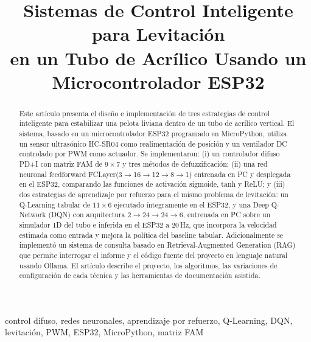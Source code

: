 \documentclass[conference]{IEEEtran}
\begin{document}
\title{Sistemas de Control Inteligente para Levitación\\
en un Tubo de Acrílico Usando un Microcontrolador ESP32}

\author{
}

\maketitle

\begin{abstract}
Este artículo presenta el diseño e implementación de tres estrategias de control inteligente para estabilizar una pelota liviana dentro de un tubo de acrílico vertical. El sistema, basado en un microcontrolador ESP32 programado en MicroPython, utiliza un sensor ultrasónico HC-SR04 como realimentación de posición y un ventilador DC controlado por PWM como actuador. Se implementaron: (i) un controlador difuso PD+I con matriz FAM de $9\times7$ y tres métodos de defuzzificación; (ii) una red neuronal feedforward FCLayer(3$\to$16$\to$12$\to$8$\to$1) entrenada en PC y desplegada en el ESP32, comparando las funciones de activación sigmoide, tanh y ReLU; y (iii) dos estrategias de aprendizaje por refuerzo para el mismo problema de levitación: un Q-Learning tabular de $11\times6$ ejecutado íntegramente en el ESP32, y una Deep Q-Network (DQN) con arquitectura 2$\to$24$\to$24$\to$6, entrenada en PC sobre un simulador 1D del tubo e inferida en el ESP32 a 20\,Hz, que incorpora la velocidad estimada como entrada y mejora la política del baseline tabular. Adicionalmente se implementó un sistema de consulta basado en Retrieval-Augmented Generation (RAG) que permite interrogar el informe y el código fuente del proyecto en lenguaje natural usando Ollama. El artículo describe el proyecto, los algoritmos, las variaciones de configuración de cada técnica y las herramientas de documentación asistida.
\end{abstract}

\begin{IEEEkeywords}
control difuso, redes neuronales, aprendizaje por refuerzo, Q-Learning, DQN, levitación, PWM, ESP32, MicroPython, matriz FAM
\end{IEEEkeywords}
\end{document}
